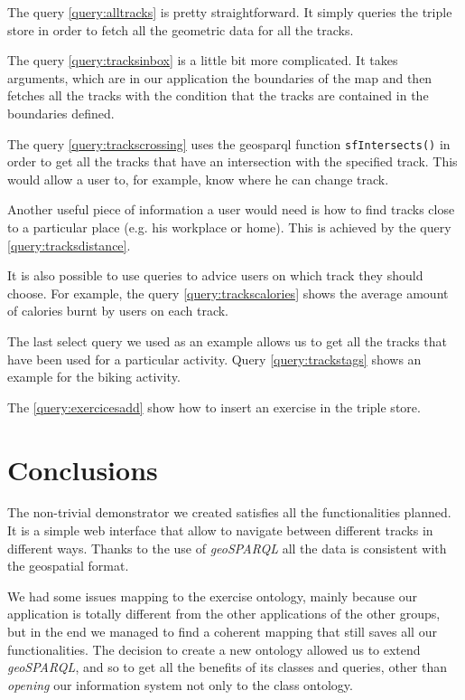 \documentclass[11pt,a4paper]{scrreprt}
\begin{document}
The query \ref{query:alltracks} is pretty straightforward. It simply queries the triple store in order to fetch all the geometric data for all the tracks.

The query \ref{query:tracksinbox} is a little bit more complicated. It takes arguments, which are in our application the boundaries of the map and then fetches all the tracks with the condition that the tracks are contained in the boundaries defined.

The query \ref{query:trackscrossing} uses the geosparql function \texttt{sfIntersects()} in order to get all the tracks that have an intersection with the specified track. This would allow a user to, for example, know where he can change track.

Another useful piece of information a user would need is how to find tracks close to a particular place (e.g. his workplace or home). This is achieved by the query \ref{query:tracksdistance}.

It is also possible to use queries to advice users on which track they should choose. For example, the query \ref{query:trackscalories} shows the average amount of calories burnt by users on each track.

The last select query we used as an example allows us to get all the tracks that have been used for a particular activity. Query \ref{query:trackstags} shows an example for the biking activity.

The \ref{query:exercicesadd} show how to insert an exercise in the triple store.



\chapter{Conclusions}
The non-trivial demonstrator we created satisfies all the functionalities planned. 
It is a simple web interface that allow to navigate between different tracks in different ways. Thanks to the use of \textit{geoSPARQL} all the data is consistent with the geospatial format.

We had some issues mapping to the exercise ontology, mainly because our application is totally different from the other applications of the other groups, but in the end we managed to find a coherent mapping that still saves all our functionalities.
The decision to create a new ontology allowed us to extend \textit{geoSPARQL}, and so to get all the benefits of its classes and queries, other than \textit{opening} our information system not only to the class ontology.
\end{document}

